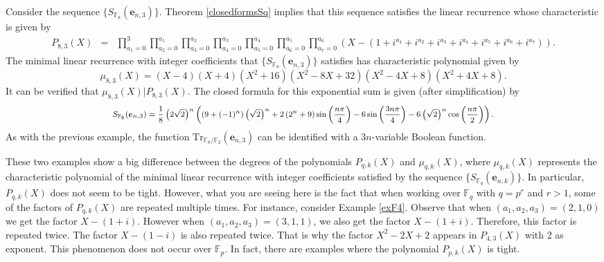 \begin{example}
 Consider the sequence $\{S_{\mathbb{F}_8}(\boldsymbol{e}_{n,3})\}$.  Theorem \ref{closedformsSq} implies that this sequence satisfies the linear recurrence whose characteristic is given by
\begin{eqnarray*}
 P_{8,3}(X)&=& \prod_{a_1=0}^3\prod_{a_2=0}^{a_1}\prod_{a_3=0}^{a_2}\prod_{a_4=0}^{a_3}\prod_{a_5=0}^{a_4}\prod_{a_6=0}^{a_5}\prod_{a_7=0}^{a_6}\left(X-\left(1+i^{a_1}+i^{a_2}+i^{a_3}+i^{a_4}+i^{a_5}+i^{a_6}+i^{a_7}\right)\right).
\end{eqnarray*}
The minimal linear recurrence with integer coefficients that $\{S_{\mathbb{F}_8}(\boldsymbol{e}_{n,3})\}$ satisfies has characteristic polynomial given by
$$\mu_{8,3}(X)=(X-4) (X+4) \left(X^2+16\right) \left(X^2-8 X+32\right) \left(X^2-4 X+8\right) \left(X^2+4 X+8\right).$$
It can be verified that $\mu_{8,3}(X)|P_{8,3}(X)$.  The closed formula for this exponential sum is given (after simplification) by
\begin{equation*}
 \footnotesize S_{\mathbb{F}_8}(\boldsymbol{e}_{n,3})=\frac{1}{8} \left(2 \sqrt{2}\right)^n \left(\left(9+(-1)^n\right) \left(\sqrt{2}\right)^n+2 \left(2^n+9\right) \sin \left(\frac{n\pi}{4}\right)
 -6 \sin \left(\frac{3n \pi}{4}\right)-6 \left(\sqrt{2}\right)^n \cos \left(\frac{n\pi}{2}\right)\right).
\end{equation*}
As with the previous example, the function $\text{Tr}_{\mathbb{F}_8/\mathbb{F}_2}(\boldsymbol{e}_{n,3})$ can be identified with a $3n$-variable Boolean function.
\end{example}

These two examples show a big difference between the degrees of the polynomials $P_{q,k}(X)$ and $\mu_{q,k}(X)$, where $\mu_{q,k}(X)$ represents the characteristic polynomial of the minimal linear recurrence
with integer coefficients satisfied by the sequence $\{S_{\mathbb{F}_q}(\boldsymbol{e}_{n,k})\}$.  In particular, $P_{q,k}(X)$ does not seem to be tight.  However, what you are seeing here
is the fact that when working over $\mathbb{F}_q$ with $q=p^r$ and $r>1$, some of the factors of $P_{q,k}(X)$ are repeated multiple times.  For instance, consider Example \ref{exF4}.  Observe that when
$(a_1,a_2,a_3)=(2,1,0)$ we get the factor $X-(1 + i)$.  However when $(a_1,a_2,a_3)=(3,1,1)$, we also get the factor $X-(1+i)$. Therefore, this factor is repeated twice. The factor $X-(1-i)$ is also repeated twice.  That is why the factor
$X^2-2 X+2$ appears in $P_{4,3}(X)$ with 2 as exponent.  This phenomenon does not occur over $\mathbb{F}_p$.  In fact, there are examples where the polynomial $P_{p,k}(X)$ is tight.

